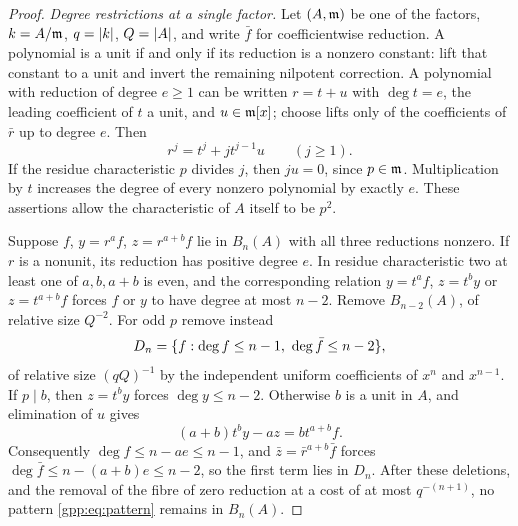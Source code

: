 \begin{proof}
\emph{Degree restrictions at a single factor.} Let $(A,\mathfrak{m})$ be one of the factors,
$k=A/\mathfrak{m}$, $q=\lvert k\rvert$, $Q=\lvert A\rvert$, and write $\bar f$ for coefficientwise reduction.
A polynomial is a unit if and only if its reduction is a nonzero constant: lift that
constant to a unit and invert the remaining nilpotent correction. A polynomial with
reduction of degree $e\ge1$ can be written $r=t+u$ with $\deg t=e$, the leading
coefficient of $t$ a unit, and $u\in\mathfrak{m}[x]$; choose lifts only of the coefficients of
$\bar r$ up to degree $e$. Then
\[
 r^j=t^j+jt^{j-1}u\qquad(j\ge1).
\]
If the residue characteristic $p$ divides $j$, then $ju=0$, since $p\in\mathfrak{m}$.
Multiplication by $t$ increases the degree of every nonzero polynomial by exactly $e$.
These assertions allow the characteristic of $A$ itself to be $p^2$.

Suppose $f$, $y=r^af$, $z=r^{a+b}f$ lie in $B_n(A)$ with all three reductions nonzero. If
$r$ is a nonunit, its reduction has positive degree $e$. In residue characteristic two at
least one of $a,b,a+b$ is even, and the corresponding relation $y=t^af$, $z=t^by$ or
$z=t^{a+b}f$ forces $f$ or $y$ to have degree at most $n-2$. Remove $B_{n-2}(A)$, of
relative size $Q^{-2}$. For odd $p$ remove instead
\[
 D_n=\set{f:\deg f\le n-1,\ \deg\bar f\le n-2},
\]
of relative size $(qQ)^{-1}$ by the independent uniform coefficients of $x^n$ and
$x^{n-1}$. If $p\mid b$, then $z=t^by$ forces $\deg y\le n-2$. Otherwise $b$ is a unit in
$A$, and elimination of $u$ gives
\begin{equation}\label{gpp:eq:eliminate}
 (a+b)t^by-az=bt^{a+b}f .
\end{equation}
Consequently $\deg f\le n-ae\le n-1$, and $\bar z=\bar r^{a+b}\bar f$ forces
$\deg\bar f\le n-(a+b)e\le n-2$, so the first term lies in $D_n$. After these deletions,
and the removal of the fibre of zero reduction at a cost of at most $q^{-(n+1)}$, no
pattern \eqref{gpp:eq:pattern} remains in $B_n(A)$.


\end{proof}
